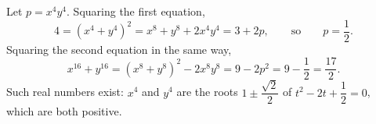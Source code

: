 Let $p=x^4y^4$. Squaring the first equation,
\[
4=\left(x^4+y^4\right)^2=x^8+y^8+2x^4y^4=3+2p,\qquad\text{so}\qquad p=\dfrac{1}{2} .
\]
Squaring the second equation in the same way,
\[
x^{16}+y^{16}=\left(x^8+y^8\right)^2-2x^8y^8=9-2p^2=9-\dfrac{1}{2}=\boxed{\dfrac{17}{2}} .
\]
Such real numbers exist: $x^4$ and $y^4$ are the roots $1\pm\dfrac{\sqrt2}{2}$ of $t^2-2t+\dfrac{1}{2}=0$, which are both positive.
